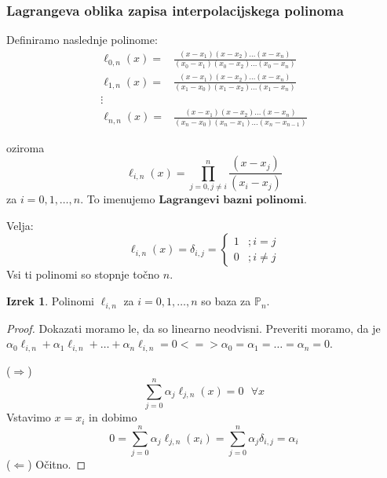 \documentclass[a4paper,12pt]{article}
\theoremstyle{definition}
\newtheorem{theorem}[counter]{Izrek}
\theoremstyle{remark}
\newcommand{\Pp}{\mathbb{P}}
\begin{document}
\subsubsection{Lagrangeva oblika zapisa interpolacijskega polinoma}
Definiramo naslednje polinome:
\begin{align*}
    \ell_{0, n} (x) =& \frac{(x-x_1)(x-x_2) \dots (x - x_n)}{(x_0 - x_1)(x_0 - x_2) \dots (x_0 - x_n)} \\
    \ell_{1, n} (x) =& \frac{(x-x_1)(x-x_2) \dots (x - x_n)}{(x_1 - x_0)(x_1 - x_2) \dots (x_1 - x_n)} \\
    \vdots &\\
    \ell_{n, n} (x) =& \frac{(x-x_1)(x-x_2) \dots (x - x_n)}{(x_n - x_0)(x_n - x_1) \dots (x_n - x_{n-1})}
\end{align*}

oziroma
\begin{equation*}
    \ell_{i, n} (x) = \prod_{j = 0, j \neq i}^{n} \frac{(x - x_j)}{(x_i - x_j)}
\end{equation*}
za $i = 0, 1, \dots, n$. To imenujemo $\textbf{Lagrangevi bazni polinomi}$.

Velja:
\begin{equation*}
    \ell_{i, n} (x) = \delta_{i, j} = \begin{cases}
        1 &; i = j \\
        0 &; i \neq j
    \end{cases}
\end{equation*}
Vsi ti polinomi so stopnje točno $n$.

\begin{theorem}
    Polinomi $\ell_{i, n}$ za $i = 0, 1, \dots, n$ so baza za $\Pp_n$.
\end{theorem}

\begin{proof}
    Dokazati moramo le, da so linearno neodvisni. Preveriti moramo, da je $\alpha_0 \ell_{i, n} +  \alpha_1 \ell_{i, n} + \dots +
    \alpha_n \ell_{i, n} = 0 <=> \alpha_0 = \alpha_1 = \dots = \alpha_n = 0$.

    ($\Longrightarrow$)
    \begin{equation*}
        \sum_{j = 0}^{n} \alpha_j \ell_{j, n} (x) = 0 \text{ }\forall x
    \end{equation*}
    Vstavimo $x = x_i$ in dobimo
    \begin{equation*}
        0 = \sum_{j = 0}^{n} \alpha_j \ell_{j, n} (x_i) = \sum_{j = 0}^{n} \alpha_j \delta_{i, j} = \alpha_i
    \end{equation*}
    ($\Longleftarrow$) Očitno.
\end{proof}
\end{document}
